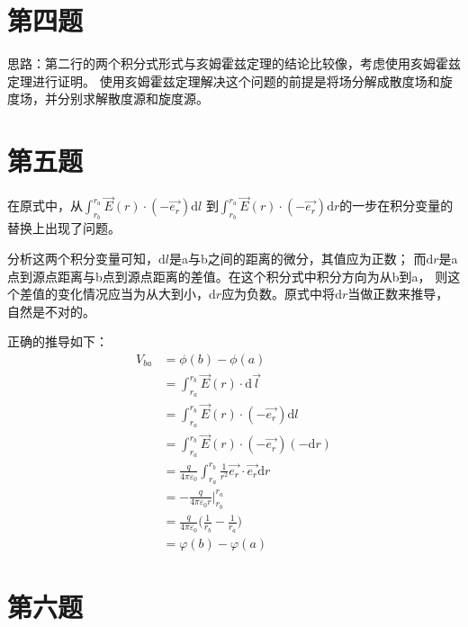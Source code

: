 \documentclass[a4paper]{article}
\begin{document}
	\section{第四题}
		思路：第二行的两个积分式形式与亥姆霍兹定理的结论比较像，考虑使用亥姆霍兹定理进行证明。
		使用亥姆霍兹定理解决这个问题的前提是将场分解成散度场和旋度场，并分别求解散度源和旋度源。

	\section{第五题}
		在原式中，从$\int _{r_b} ^{r_a} \vec{E}(r)\cdot(-\vec{e_r}) \mathrm{d}l$
		到$\int _{r_b} ^{r_a} \vec{E}(r)\cdot(-\vec{e_r}) \mathrm{d}r$的一步在积分变量的替换上出现了问题。

		分析这两个积分变量可知，$\mathrm{d}l$是a与b之间的距离的微分，其值应为正数；
		而$\mathrm{d}r$是a点到源点距离与b点到源点距离的差值。在这个积分式中积分方向为从b到a，
		则这个差值的变化情况应当为从大到小，$\mathrm{d}r$应为负数。原式中将$\mathrm{d}r$当做正数来推导，自然是不对的。

		正确的推导如下：
		\begin{equation}
			\begin{split}
				V_{ba} &= \phi(b) - \phi(a)\\
				&= \int _{r_a} ^{r_b} \vec{E}(r)\cdot\mathrm{d}\vec{l}\\
				&= \int _{r_a} ^{r_b} \vec{E}(r)\cdot(-\vec{e_r})\mathrm{d}l\\
				&= \int _{r_a} ^{r_b} \vec{E}(r)\cdot(-\vec{e_r})(-\mathrm{d}r)\\
				&= \frac{q}{4\pi\varepsilon_0} \int _{r_a} ^{r_b} \frac{1}{r^2}\vec{e_r}\cdot\vec{e_r}\mathrm{d}r\\
				&= - \frac{q}{4\pi\varepsilon_0 r} \bigg| _{r_b} ^{r_a}\\
				&= \frac{q}{4\pi\varepsilon_0} \bigg(\frac{1}{r_b} - \frac{1}{r_a} \bigg)\\
				&= \varphi(b)-\varphi(a)
			\end{split}
		\end{equation}
	
	\section{第六题}
\end{document}
